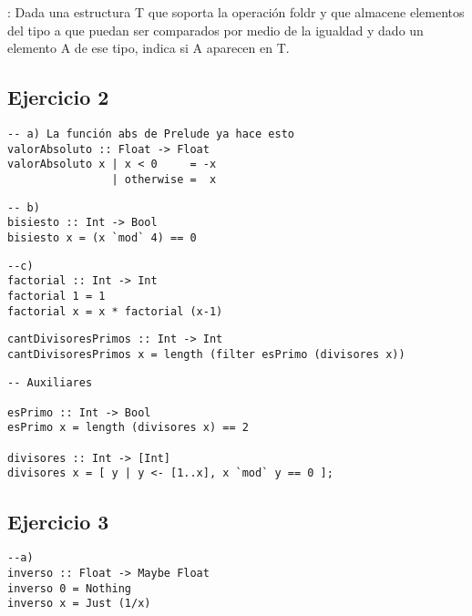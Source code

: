 \documentclass[10pt,a4paper]{article}
\begin{document}
\vspace*{5mm}
: Dada una estructura T que soporta la operación foldr y que almacene elementos del tipo a que puedan ser comparados por medio de la igualdad y dado un elemento A de ese tipo, indica si A aparecen en T.

\subsection{Ejercicio 2}
\begin{centrado}
\begin{verbatim}
-- a) La función abs de Prelude ya hace esto
valorAbsoluto :: Float -> Float
valorAbsoluto x | x < 0     = -x
                | otherwise =  x
\end{verbatim}
\end{centrado}
\begin{centrado}
	\begin{verbatim}
-- b) 
bisiesto :: Int -> Bool
bisiesto x = (x `mod` 4) == 0
	\end{verbatim}
\end{centrado}
\begin{centrado}
	\begin{verbatim}
--c)
factorial :: Int -> Int
factorial 1 = 1
factorial x = x * factorial (x-1)
	\end{verbatim}
\end{centrado}
\begin{centrado}
	\begin{verbatim}
cantDivisoresPrimos :: Int -> Int
cantDivisoresPrimos x = length (filter esPrimo (divisores x))
	\end{verbatim}
\end{centrado}

\begin{centrado}
	\begin{verbatim}
-- Auxiliares 

esPrimo :: Int -> Bool
esPrimo x = length (divisores x) == 2

divisores :: Int -> [Int]
divisores x = [ y | y <- [1..x], x `mod` y == 0 ];
	\end{verbatim}
\end{centrado}

\subsection{Ejercicio 3}
\begin{centrado}
\begin{verbatim}
--a)
inverso :: Float -> Maybe Float
inverso 0 = Nothing
inverso x = Just (1/x)
\end{verbatim}
\end{centrado}
\end{document}
